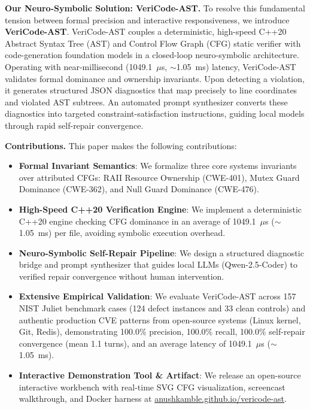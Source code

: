 \documentclass[sigconf,screen,nonacm,pbalance]{acmart}
\begin{document}
\noindent\textbf{Our Neuro-Symbolic Solution: VeriCode-AST.} To resolve this fundamental tension between formal precision and interactive responsiveness, we introduce \textbf{VeriCode-AST}. VeriCode-AST couples a deterministic, high-speed C++20 Abstract Syntax Tree (AST) and Control Flow Graph (CFG) static verifier with code-generation foundation models in a closed-loop neuro-symbolic architecture. Operating with near-millisecond (1049.1~$\mu$s, $\sim$1.05~ms) latency, VeriCode-AST validates formal dominance and ownership invariants. Upon detecting a violation, it generates structured JSON diagnostics that map precisely to line coordinates and violated AST subtrees. An automated prompt synthesizer converts these diagnostics into targeted constraint-satisfaction instructions, guiding local models through rapid self-repair convergence.

\noindent\textbf{Contributions.} This paper makes the following contributions:
\begin{itemize}
    \item \textbf{Formal Invariant Semantics}: We formalize three core systems invariants over attributed CFGs: RAII Resource Ownership (CWE-401), Mutex Guard Dominance (CWE-362), and Null Guard Dominance (CWE-476).
    \item \textbf{High-Speed C++20 Verification Engine}: We implement a deterministic C++20 engine checking CFG dominance in an average of 1049.1~$\mu$s ($\sim$1.05~ms) per file, avoiding symbolic execution overhead.
    \item \textbf{Neuro-Symbolic Self-Repair Pipeline}: We design a structured diagnostic bridge and prompt synthesizer that guides local LLMs (Qwen-2.5-Coder) to verified repair convergence without human intervention.
    \item \textbf{Extensive Empirical Validation}: We evaluate VeriCode-AST across 157 NIST Juliet benchmark cases (124 defect instances and 33 clean controls) and authentic production CVE patterns from open-source systems (Linux kernel, Git, Redis), demonstrating 100.0\% precision, 100.0\% recall, 100.0\% self-repair convergence (mean 1.1 turns), and an average latency of 1049.1~$\mu$s ($\sim$1.05~ms).
    \item \textbf{Interactive Demonstration Tool \& Artifact}: We release an open-source interactive workbench with real-time SVG CFG visualization, screencast walkthrough, and Docker harness at \href{https://anushkamble.github.io/vericode-ast/}{anushkamble.github.io/vericode-ast}.
\end{itemize}
\end{document}
